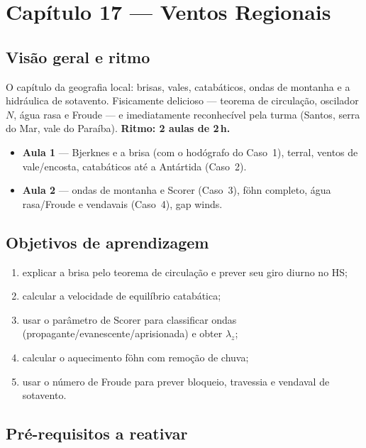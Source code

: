 \section{Capítulo 17 --- Ventos Regionais}

\subsection*{Visão geral e ritmo}

O capítulo da geografia local: brisas, vales, catabáticos, ondas de
montanha e a hidráulica de sotavento. Fisicamente delicioso — teorema
de circulação, oscilador $N$, água rasa e Froude — e imediatamente
reconhecível pela turma (Santos, serra do Mar, vale do Paraíba).
\textbf{Ritmo: 2 aulas de 2\,h.}

\begin{itemize}
  \item \textbf{Aula 1} — Bjerknes e a brisa (com o hodógrafo do
        Caso~1), terral, ventos de vale/encosta, catabáticos até a
        Antártida (Caso~2).
  \item \textbf{Aula 2} — ondas de montanha e Scorer (Caso~3), föhn
        completo, água rasa/Froude e vendavais (Caso~4), gap winds.
\end{itemize}

\subsection*{Objetivos de aprendizagem}

\begin{enumerate}
  \item explicar a brisa pelo teorema de circulação e prever seu giro
        diurno no HS;
  \item calcular a velocidade de equilíbrio catabática;
  \item usar o parâmetro de Scorer para classificar ondas
        (propagante/evanescente/aprisionada) e obter $\lambda_z$;
  \item calcular o aquecimento föhn com remoção de chuva;
  \item usar o número de Froude para prever bloqueio, travessia e
        vendaval de sotavento.
\end{enumerate}

\subsection*{Pré-requisitos a reativar}

